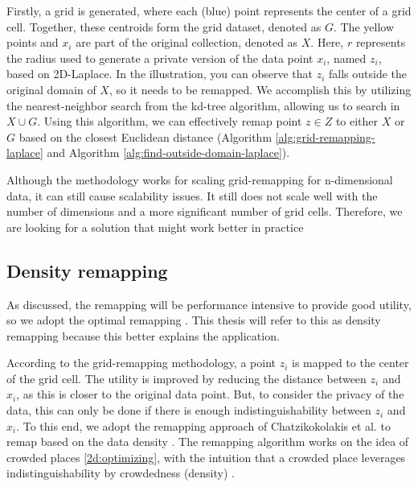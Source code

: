 Firstly, a grid is generated, where each (blue) point represents the center of a grid cell.
Together, these centroids form the grid dataset, denoted as $G$.
The yellow points and $x_i$ are part of the original collection, denoted as $X$.
Here, $r$ represents the radius used to generate a private version of the data point $x_i$, named $z_i$, based on 2D-Laplace.
In the illustration, you can observe that $z_i$ falls outside the original domain of $X$, so it needs to be remapped.
We accomplish this by utilizing the nearest-neighbor search from the kd-tree algorithm, allowing us to search in $X \cup G$.
Using this algorithm, we can effectively remap point $z \in Z$ to either $X$ or $G$ based on the closest Euclidean distance (Algorithm \ref{alg:grid-remapping-laplace} and Algorithm \ref{alg:find-outside-domain-laplace}).

Although the methodology works for scaling grid-remapping for n-dimensional data, it can still cause scalability issues.
It still does not scale well with the number of dimensions and a more significant number of grid cells.
Therefore, we are looking for a solution that might work better in practice



\newpage
\subsection{Density remapping} \label{theory:optimal-remapping}
As discussed, the remapping will be performance intensive to provide good utility, so we adopt the optimal remapping \citep{chatzikokolakis_efficient_2017}.
This thesis will refer to this as density remapping because this better explains the application.

According to the grid-remapping methodology, a point $z_i$ is mapped to the center of the grid cell.
The utility is improved by reducing the distance between $z_i$ and $x_i$, as this is closer to the original data point.
But, to consider the privacy of the data, this can only be done if there is enough indistinguishability between $z_i$ and $x_i$.
To this end, we adopt the remapping approach of Chatzikokolakis et al. to remap based on the data density \citep{chatzikokolakis_efficient_2017}.
The remapping algorithm works on the idea of crowded places \ref{2d:optimizing}, with the intuition that a crowded place leverages indistinguishability by crowdedness (density) \citep{chatzikokolakis_efficient_2017}.  \newline

